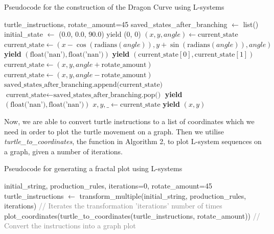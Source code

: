 \documentclass[a4paper,11pt, titlepage]{article}
\theoremstyle{definition}
\theoremstyle{plain}
\theoremstyle{remark}
\theoremstyle{definition}
\begin{document}
\begin{algorithm}
\caption{Pseudocode for the construction of the Dragon Curve using L-systems \cite{butlerLSys}}
\begin{algorithmic}[1]
\REQUIRE turtle\_instructions, rotate\_amount=45
\STATE saved\_states\_after\_branching $\leftarrow$ list()
\STATE initial\_state $\leftarrow$ (0.0, 0.0, 90.0)
\STATE yield (0, 0)
    \STATE $(x, y, angle) \gets \text{current\_state}$
        \STATE $\text{current\_state} \gets (x - \cos(\text{radians}(angle)), y + \sin(\text{radians}(angle)), angle)$
            \STATE \textbf{yield} $(\text{float('nan')}, \text{float('nan')})$
        \ENDIF
        \STATE \textbf{yield} $(\text{current\_state}[0], \text{current\_state}[1])$
    \ENDIF
        \STATE $\text{current\_state} \gets (x, y, angle + \text{rotate\_amount})$
        \STATE $\text{current\_state} \gets (x, y, angle - \text{rotate\_amount})$
    \ELSIF{instruction == '['}
        \STATE $\text{saved\_states\_after\_branching.append(current\_state)}$
    \ELSIF{instruction == ']'}
        \STATE $\text{current\_state} \gets \text{saved\_states\_after\_branching.pop()}$
        \STATE \textbf{yield} $(\text{float('nan')}, \text{float('nan')})$
        \STATE $x, y, \_ \gets \text{current\_state}$
        \STATE \textbf{yield} $(x, y)$
    \ENDIF
\ENDFOR
\end{algorithmic}
\end{algorithm}


Now, we are able to convert turtle instructions to a list of coordinates which we need in order to plot the turtle movement on a graph. Then we utilise \textit{turtle\_to\_coordinates}, the function in Algorithm 2, to plot L-system sequences on a graph, given a number of iterations.

\begin{algorithm}
\caption{Pseudocode for generating a fractal plot using L-systems \cite{butlerLSys}}
\begin{algorithmic}[1]
\REQUIRE initial\_string, production\_rules, iterations=0, rotate\_amount=45
\STATE turtle\_instructions $\gets$ transform\_multiple(initial\_string, production\_rules, iterations) \textcolor{gray}{// Iterates the transformation 'iterations' number of times}
\STATE plot\_coordinates(turtle\_to\_coordinates(turtle\_instructions, rotate\_amount)) \textcolor{gray}{// Convert the instructions into a graph plot}
\end{algorithmic}
\end{algorithm}
\end{document}
